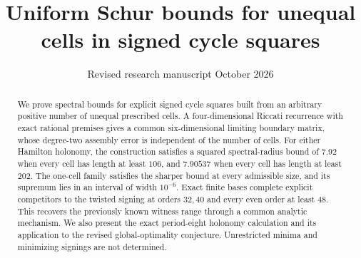 \documentclass[11pt]{article}
\title{Uniform Schur bounds for unequal cells in signed cycle squares}
\author{}
\date{Revised research manuscript\quad 5 October 2026}
\theoremstyle{remark}\newtheorem{remark}[theorem]{Remark}
\begin{document}
\maketitle
\begin{abstract}
We prove spectral bounds for explicit signed cycle squares built from an
arbitrary positive number of unequal prescribed cells. A four-dimensional
Riccati recurrence with exact rational premises gives a common
six-dimensional limiting boundary matrix, whose degree-two assembly error
is independent of the number of cells. For either Hamilton holonomy,
the construction satisfies a squared spectral-radius bound of
$7.92$ when every cell has length at least $106$, and $7.90537$ when every
cell has length at least $202$. The one-cell family satisfies the
sharper bound at every admissible size, and its supremum lies in an interval
of width $10^{-6}$. Exact finite bases complete explicit competitors to the
twisted signing at orders $32,40$ and every even order at least $48$.
This recovers the previously known witness range through a common analytic
mechanism. We also present the exact period-eight holonomy calculation and
its application to the revised global-optimality conjecture. Unrestricted
minima and minimizing signings are not determined.
\end{abstract}








\end{document}
